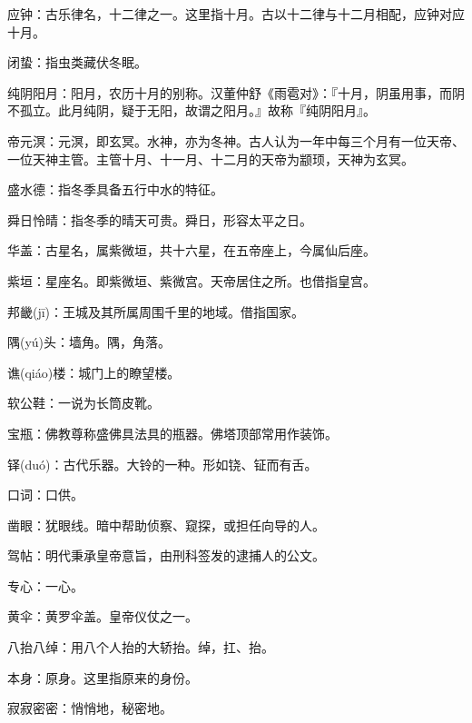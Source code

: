 \startbuffer[1796]
应钟：古乐律名，十二律之一。这里指十月。古以十二律与十二月相配，应钟对应十月。
\stopbuffer


\startbuffer[1797]
闭蛰：指虫类藏伏冬眠。
\stopbuffer


\startbuffer[1798]
纯阴阳月：阳月，农历十月的别称。汉董仲舒《雨雹对》：『十月，阴虽用事，而阴不孤立。此月纯阴，疑于无阳，故谓之阳月。』故称『纯阴阳月』。
\stopbuffer


\startbuffer[1799]
帝元溟：元溟，即玄冥。水神，亦为冬神。古人认为一年中每三个月有一位天帝、一位天神主管。主管十月、十一月、十二月的天帝为颛顼，天神为玄冥。
\stopbuffer


\startbuffer[1800]
盛水德：指冬季具备五行中水的特征。
\stopbuffer


\startbuffer[1801]
舜日怜晴：指冬季的晴天可贵。舜日，形容太平之日。
\stopbuffer


\startbuffer[1802]
华盖：古星名，属紫微垣，共十六星，在五帝座上，今属仙后座。
\stopbuffer


\startbuffer[1803]
紫垣：星座名。即紫微垣、紫微宫。天帝居住之所。也借指皇宫。
\stopbuffer


\startbuffer[1804]
邦畿(jī)：王城及其所属周围千里的地域。借指国家。
\stopbuffer


\startbuffer[1805]
隅(yú)头：墙角。隅，角落。
\stopbuffer


\startbuffer[1806]
谯(qiáo)楼：城门上的瞭望楼。
\stopbuffer


\startbuffer[1807]
软公鞋：一说为长筒皮靴。
\stopbuffer


\startbuffer[1808]
宝瓶：佛教尊称盛佛具法具的瓶器。佛塔顶部常用作装饰。
\stopbuffer


\startbuffer[1809]
铎(duó)：古代乐器。大铃的一种。形如铙、钲而有舌。
\stopbuffer


\startbuffer[1810]
口词：口供。
\stopbuffer


\startbuffer[1811]
凿眼：犹眼线。暗中帮助侦察、窥探，或担任向导的人。
\stopbuffer


\startbuffer[1812]
驾帖：明代秉承皇帝意旨，由刑科签发的逮捕人的公文。
\stopbuffer


\startbuffer[1813]
专心：一心。
\stopbuffer


\startbuffer[1814]
黄伞：黄罗伞盖。皇帝仪仗之一。
\stopbuffer


\startbuffer[1815]
八抬八绰：用八个人抬的大轿抬。绰，扛、抬。
\stopbuffer


\startbuffer[1816]
本身：原身。这里指原来的身份。
\stopbuffer


\startbuffer[1817]
寂寂密密：悄悄地，秘密地。
\stopbuffer


